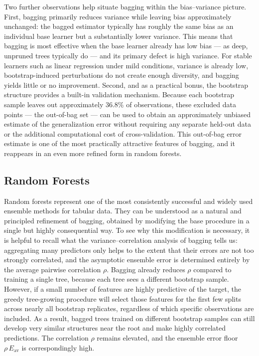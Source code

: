 \medskip

Two further observations help situate bagging within the bias--variance picture. First, bagging primarily reduces variance while leaving bias approximately unchanged: the bagged estimator typically has roughly the same bias as an individual base learner but a substantially lower variance. This means that bagging is most effective when the base learner already has low bias --- as deep, unpruned trees typically do --- and its primary defect is high variance. For stable learners such as linear regression under mild conditions, variance is already low, bootstrap-induced perturbations do not create enough diversity, and bagging yields little or no improvement. Second, and as a practical bonus, the bootstrap structure provides a built-in validation mechanism. Because each bootstrap sample leaves out approximately $36.8\%$ of observations, these excluded data points --- the \alert{out-of-bag} set --- can be used to obtain an approximately unbiased estimate of the generalization error without requiring any separate held-out data or the additional computational cost of cross-validation. This out-of-bag error estimate is one of the most practically attractive features of bagging, and it reappears in an even more refined form in random forests.

\subsection*{Random Forests}

Random forests represent one of the most consistently successful and widely used ensemble methods for tabular data. They can be understood as a natural and principled refinement of bagging, obtained by modifying the base procedure in a single but highly consequential way. To see why this modification is necessary, it is helpful to recall what the variance--correlation analysis of bagging tells us: aggregating many predictors only helps to the extent that their errors are not too strongly correlated, and the asymptotic ensemble error is determined entirely by the average pairwise correlation $\rho$. Bagging already reduces $\rho$ compared to training a single tree, because each tree sees a different bootstrap sample. However, if a small number of features are highly predictive of the target, the greedy tree-growing procedure will select those features for the first few splits across nearly all bootstrap replicates, regardless of which specific observations are included. As a result, bagged trees trained on different bootstrap samples can still develop very similar structures near the root and make highly correlated predictions. The correlation $\rho$ remains elevated, and the ensemble error floor $\rho\,E_{\mathrm{av}}$ is correspondingly high.

